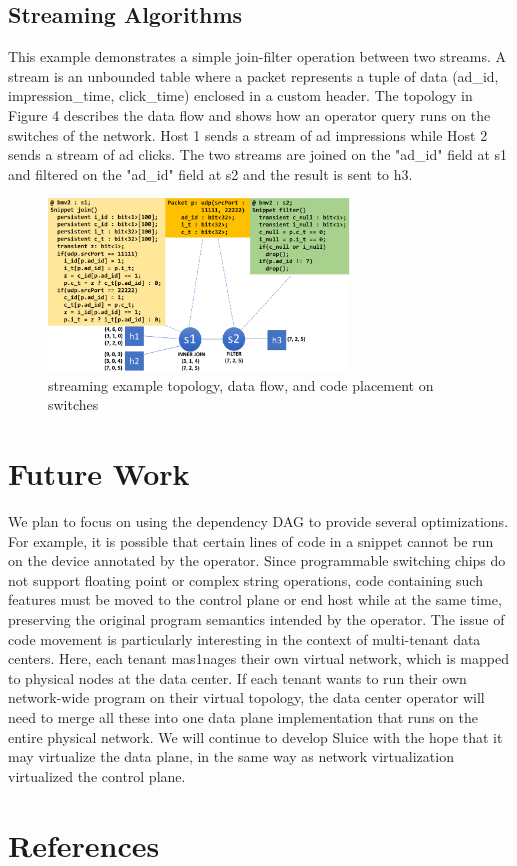 \subsection{Streaming Algorithms}
This example demonstrates a simple join-filter operation between two streams. A stream is an unbounded table where a packet represents a tuple of data (ad\_id, impression\_time, click\_time) enclosed in a custom header. The topology in Figure 4 describes the data flow and shows how an operator query runs on the switches of the network. Host 1 sends a stream of ad impressions while Host 2 sends a stream of ad clicks. The two streams are joined on the "ad\_id" field at s1 and filtered on the "ad\_id" field at s2 and the result is sent to h3. 

\begin{figure}[tp]
\centering
\includegraphics[width=80mm,scale=0.7]{figures/streaming_example}
\caption{streaming example topology, data flow, and code placement on switches}
\end{figure}


\section{Future Work}
We plan to focus on using the dependency DAG to provide several optimizations. For example, it is possible that certain lines of code in a snippet cannot be run on the device annotated by the operator. Since programmable switching chips do not support floating point or complex string operations, code containing such features must be moved to the control plane or end host while at the same time, preserving the original program semantics intended by the operator. The issue of code movement is particularly interesting in the context of multi-tenant data centers. Here, each tenant mas1nages their own virtual network, which is mapped to physical nodes at the data center. If each tenant wants to run their own network-wide program on their virtual topology, the data center operator will need to merge all these into one data plane implementation that runs on the entire physical network. We will continue to develop Sluice with the hope that it may virtualize the data plane, in the same way as network virtualization virtualized the control plane.

\section{References}
